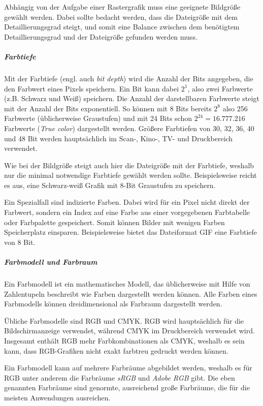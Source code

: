 Abhängig von der Aufgabe einer Rastergrafik muss eine geeignete Bildgröße gewählt werden. Dabei sollte bedacht werden, dass die Dateigröße mit dem Detaillierungsgrad steigt, und somit eine Balance zwischen dem benötigtem Detaillierungsgrad und der Dateigröße gefunden werden muss.


\subparagraph{Farbtiefe}

Mit der Farbtiefe (engl. auch \emph{bit depth}) wird die Anzahl der Bits angegeben, die den Farbwert eines Pixels speichern. Ein Bit kann dabei $2^1$, also zwei Farbwerte (z.B. Schwarz und Weiß) speichern. Die Anzahl der darstellbaren Farbwerte steigt mit der Anzahl der Bits exponentiell. So können mit 8 Bits bereits $2^8$ also 256 Farbwerte (üblicherweise Graustufen) und mit 24 Bits schon $2^{24} = 16.777.216$ Farbwerte (\emph{True color}) dargestellt werden. Größere Farbtiefen von 30, 32, 36, 40 und 48 Bit werden hauptsächlich im Scan-, Kino-, TV- und Druckbereich verwendet.

Wie bei der Bildgröße steigt auch hier die Dateigröße mit der Farbtiefe, weshalb nur die minimal notwendige Farbtiefe gewählt werden sollte. Beispielsweise reicht es aus, eine Schwarz-weiß Grafik mit 8-Bit Graustufen zu speichern.

Ein Spezialfall sind indizierte Farben. Dabei wird für ein Pixel nicht direkt der Farbwert, sondern ein Index auf eine Farbe aus einer vorgegebenen Farbtabelle oder Farbpalette gespeichert. Somit können Bilder mit wenigen Farben Speicherplatz einsparen. Beispielsweise bietet das Dateiformat GIF eine Farbtiefe von 8 Bit.


\subparagraph{Farbmodell und Farbraum}

Ein Farbmodell ist ein mathematisches Modell, das üblicherweise mit Hilfe von Zahlentupeln beschreibt wie Farben dargestellt werden können. Alle Farben eines Farbmodells können dreidimensional als Farbraum dargestellt werden.

Übliche Farbmodelle sind RGB und CMYK. RGB wird hauptsächlich für die Bildschirmanzeige verwendet, während CMYK im Druckbereich verwendet wird. Insgesamt enthält RGB mehr Farbkombinationen als CMYK, weshalb es sein kann, dass RGB-Grafiken nicht exakt farbtreu gedruckt werden können. 

Ein Farbmodell kann auf mehrere Farbräume abgebildet werden, weshalb es für RGB unter anderem die Farbräume \emph{sRGB} und \emph{Adobe RGB} gibt. Die eben genannten Farbräume sind genormte, ausreichend große Farbräume, die für die meisten Anwendungen ausreichen.

